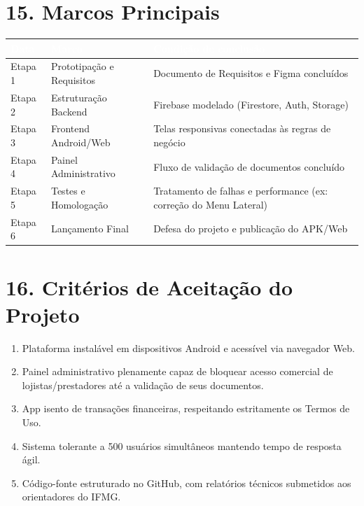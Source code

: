 \documentclass[11pt, a4paper]{article}
\begin{document}
\section*{\textcolor{headerblue}{15. Marcos Principais}}
\begin{center}
\renewcommand{\arraystretch}{1.3}
\begin{tabularx}{\textwidth}{|l|l|X|}
\hline
\rowcolor{headerblue}
\textcolor{white}{\textbf{Data}} & \textcolor{white}{\textbf{Marco}} & \textcolor{white}{\textbf{Condição de conclusão}} \\
\hline
Etapa 1 & Prototipação e Requisitos & Documento de Requisitos e Figma concluídos \\
\hline
Etapa 2 & Estruturação Backend & Firebase modelado (Firestore, Auth, Storage) \\
\hline
Etapa 3 & Frontend Android/Web & Telas responsivas conectadas às regras de negócio \\
\hline
Etapa 4 & Painel Administrativo & Fluxo de validação de documentos concluído \\
\hline
Etapa 5 & Testes e Homologação & Tratamento de falhas e performance (ex: correção do Menu Lateral) \\
\hline
Etapa 6 & Lançamento Final & Defesa do projeto e publicação do APK/Web \\
\hline
\end{tabularx}
\end{center}

\section*{\textcolor{headerblue}{16. Critérios de Aceitação do Projeto}}
\begin{enumerate}[label=\arabic*.]
    \item Plataforma instalável em dispositivos Android e acessível via navegador Web.
    \item Painel administrativo plenamente capaz de bloquear acesso comercial de lojistas/prestadores até a validação de seus documentos.
    \item App isento de transações financeiras, respeitando estritamente os Termos de Uso.
    \item Sistema tolerante a 500 usuários simultâneos mantendo tempo de resposta ágil.
    \item Código-fonte estruturado no GitHub, com relatórios técnicos submetidos aos orientadores do IFMG.
\end{enumerate}
\end{document}
